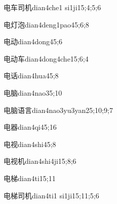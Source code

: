 \begin{verbete}{电车司机}{dian4che1 si1ji1}{5;4;5;6}
\end{verbete}

\begin{verbete}{电灯泡}{dian4deng1pao4}{5;6;8}
\end{verbete}

\begin{verbete}{电动}{dian4dong4}{5;6}
\end{verbete}

\begin{verbete}{电动车}{dian4dong4che1}{5;6;4}
\end{verbete}

\begin{verbete}{电话}{dian4hua4}{5;8}
\end{verbete}

\begin{verbete}{电脑}{dian4nao3}{5;10}
\end{verbete}

\begin{verbete}{电脑语言}{dian4nao3yu3yan2}{5;10;9;7}
\end{verbete}

\begin{verbete}{电器}{dian4qi4}{5;16}
\end{verbete}

\begin{verbete}{电视}{dian4shi4}{5;8}
\end{verbete}

\begin{verbete}{电视机}{dian4shi4ji1}{5;8;6}
\end{verbete}

\begin{verbete}{电梯}{dian4ti1}{5;11}
\end{verbete}

\begin{verbete}{电梯司机}{dian4ti1 si1ji1}{5;11;5;6}
\end{verbete}

